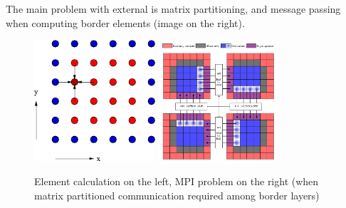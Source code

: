 \documentclass{article}
\begin{document}
        The main problem with external is matrix partitioning, and message passing when computing
        border elements (image on the right).\\

                \begin{figure}[h]
                \caption{Element calculation on the left, MPI problem on the right (when
                matrix partitioned communication required among border layers)}
                    \vspace{0.3cm}
                    \centering
                    \includegraphics[width=0.40\textwidth]{jacobi.png}
                    \hspace{1.5cm}
                    \includegraphics[trim=17 0 0 10mm, width=0.40\textwidth]{heat2d_mpi.png}
                \end{figure}
        

        \pagebreak
\end{document}
